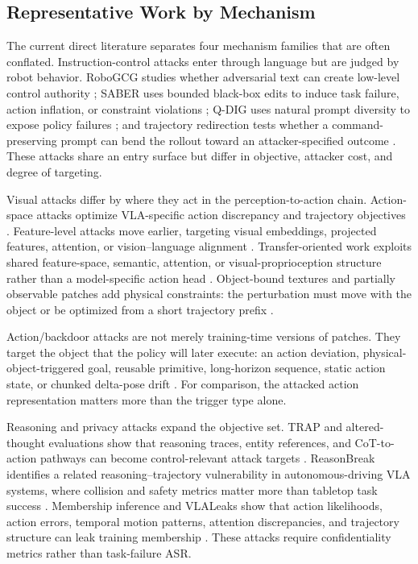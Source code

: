 \subsection{Representative Work by Mechanism}

The current direct literature separates four mechanism families that are often conflated. Instruction-control attacks enter through language but are judged by robot behavior. RoboGCG studies whether adversarial text can create low-level control authority \cite{jones2025robogcg}; SABER uses bounded black-box edits to induce task failure, action inflation, or constraint violations \cite{wu2026saber}; Q-DIG uses natural prompt diversity to expose policy failures \cite{srikanth2026qdig}; and trajectory redirection tests whether a command-preserving prompt can bend the rollout toward an attacker-specified outcome \cite{puthumanaillam2026trajectory}. These attacks share an entry surface but differ in objective, attacker cost, and degree of targeting.

Visual attacks differ by where they act in the perception-to-action chain. Action-space attacks optimize VLA-specific action discrepancy and trajectory objectives \cite{wang2025vlaadversarial}. Feature-level attacks move earlier, targeting visual embeddings, projected features, attention, or vision--language alignment \cite{xu2025edpa,zhang2025advla}. Transfer-oriented work exploits shared feature-space, semantic, attention, or visual-proprioception structure rather than a model-specific action head \cite{lu2026patch,fu2026vlahijack}. Object-bound textures and partially observable patches add physical constraints: the perturbation must move with the object or be optimized from a short trajectory prefix \cite{chen2026tex3d,wang2026partialpatch}.

Action/backdoor attacks are not merely training-time versions of patches. They target the object that the policy will later execute: an action deviation, physical-object-triggered goal, reusable primitive, long-horizon sequence, static action state, or chunked delta-pose drift \cite{zhou2025badvla,zhou2025goba,xu2025dropvla,li2025attackvla,wang2025freezevla,xu2026silentdrift}. For comparison, the attacked action representation matters more than the trigger type alone.

Reasoning and privacy attacks expand the objective set. TRAP and altered-thought evaluations show that reasoning traces, entity references, and CoT-to-action pathways can become control-relevant attack targets \cite{huang2026trap,altered2026thoughts}. ReasonBreak identifies a related reasoning--trajectory vulnerability in autonomous-driving VLA systems, where collision and safety metrics matter more than tabletop task success \cite{teymoorianfard2026reasonbreak}. Membership inference and VLALeaks show that action likelihoods, action errors, temporal motion patterns, attention discrepancies, and trajectory structure can leak training membership \cite{peng2026miavla,luan2026vlaleaks}. These attacks require confidentiality metrics rather than task-failure ASR.


